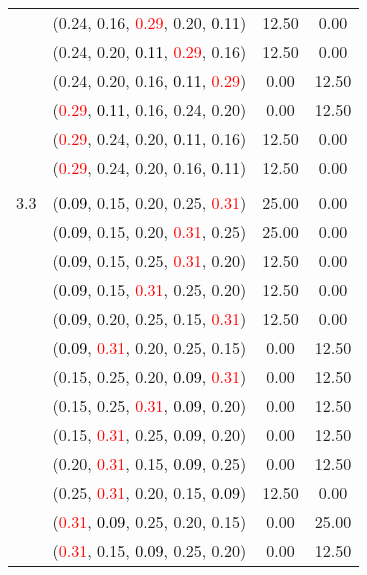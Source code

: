 \documentclass[10pt,a4paper]{report}
\begin{document}
\begin{center}
\begin{longtable}{clcc}
			&(0.24, 0.16, \textcolor{red}{0.29}, 0.20, \textcolor{black}{0.11})&12.50&0.00\\
			&(0.24, 0.20, \textcolor{black}{0.11}, \textcolor{red}{0.29}, 0.16)&12.50&0.00\\
			&(0.24, 0.20, 0.16, \textcolor{black}{0.11}, \textcolor{red}{0.29})&0.00&12.50\\
			&(\textcolor{red}{0.29}, \textcolor{black}{0.11}, 0.16, 0.24, 0.20)&0.00&12.50\\
			&(\textcolor{red}{0.29}, 0.24, 0.20, \textcolor{black}{0.11}, 0.16)&12.50&0.00\\
			&(\textcolor{red}{0.29}, 0.24, 0.20, 0.16, \textcolor{black}{0.11})&12.50&0.00\\
		&&&\\
		3.3			&(\textcolor{black}{0.09}, 0.15, 0.20, 0.25, \textcolor{red}{0.31})&25.00&0.00\\
			&(\textcolor{black}{0.09}, 0.15, 0.20, \textcolor{red}{0.31}, 0.25)&25.00&0.00\\
			&(\textcolor{black}{0.09}, 0.15, 0.25, \textcolor{red}{0.31}, 0.20)&12.50&0.00\\
			&(\textcolor{black}{0.09}, 0.15, \textcolor{red}{0.31}, 0.25, 0.20)&12.50&0.00\\
			&(\textcolor{black}{0.09}, 0.20, 0.25, 0.15, \textcolor{red}{0.31})&12.50&0.00\\
			&(\textcolor{black}{0.09}, \textcolor{red}{0.31}, 0.20, 0.25, 0.15)&0.00&12.50\\
			&(0.15, 0.25, 0.20, \textcolor{black}{0.09}, \textcolor{red}{0.31})&0.00&12.50\\
			&(0.15, 0.25, \textcolor{red}{0.31}, \textcolor{black}{0.09}, 0.20)&0.00&12.50\\
			&(0.15, \textcolor{red}{0.31}, 0.25, \textcolor{black}{0.09}, 0.20)&0.00&12.50\\
			&(0.20, \textcolor{red}{0.31}, 0.15, \textcolor{black}{0.09}, 0.25)&0.00&12.50\\
			&(0.25, \textcolor{red}{0.31}, 0.20, 0.15, \textcolor{black}{0.09})&12.50&0.00\\
			&(\textcolor{red}{0.31}, \textcolor{black}{0.09}, 0.25, 0.20, 0.15)&0.00&25.00\\
			&(\textcolor{red}{0.31}, 0.15, \textcolor{black}{0.09}, 0.25, 0.20)&0.00&12.50\\
		\bottomrule
	\end{longtable}
\end{center}
\end{document}
